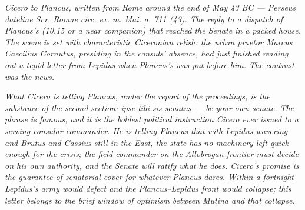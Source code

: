 
\textit{Cicero to Plancus, written from Rome around the end of
May 43 BC --- Perseus dateline \textit{Scr. Romae circ. ex. m.
Mai. a. 711 (43)}. The reply to a dispatch of Plancus's (10.15
or a near companion) that reached the Senate in a packed
house. The scene is set with characteristic Ciceronian relish:
the urban praetor Marcus Caecilius Cornutus, presiding in the
consuls' absence, had just finished reading out a tepid letter
from Lepidus when Plancus's was put before him. The contrast
was the news.}

\textit{What Cicero is telling Plancus, under the report of
the proceedings, is the substance of the second section:
\textit{ipse tibi sis senatus} --- be your own senate. The
phrase is famous, and it is the boldest political instruction
Cicero ever issued to a serving consular commander. He is
telling Plancus that with Lepidus wavering and Brutus and
Cassius still in the East, the state has no machinery left
quick enough for the crisis; the field commander on the
Allobrogan frontier must decide on his own authority, and the
Senate will ratify what he does. Cicero's promise is the
guarantee of senatorial cover for whatever Plancus dares.
Within a fortnight Lepidus's army would defect and the
Plancus--Lepidus front would collapse; this letter belongs to
the brief window of optimism between Mutina and that
collapse.}
